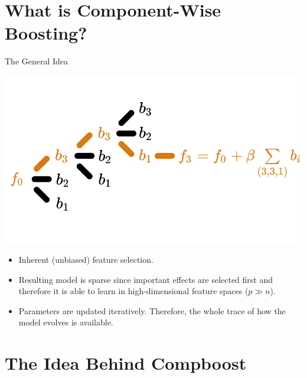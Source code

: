 \documentclass[10pt]{beamer}\usepackage[]{graphicx}\usepackage[]{color}
\begin{document}
\section{What is Component-Wise Boosting?}

\begin{frame}{The General Idea}

\begin{center}
\includegraphics[width=\textwidth]{./images/cboost_gif_norisk.png}
\end{center}

\end{frame}

\begin{frame}{}

  \begin{itemize}

    \item
      Inherent (unbiased) feature selection.

    \item
      Resulting model is sparse since important effects are selected first and therefore it is able to learn in high-dimensional feature spaces ($p \gg n$).

    \item
      Parameters are updated iteratively. Therefore, the whole trace of how the model evolves is available.

  \end{itemize}

\end{frame}




\section{The Idea Behind Compboost}
\end{document}
